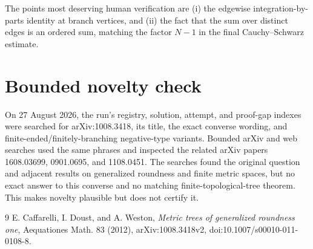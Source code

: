 \documentclass[11pt]{article}
\begin{document}
The points most deserving human verification are (i) the edgewise
integration-by-parts identity at branch vertices, and (ii) the fact that the
sum over distinct edges is an ordered sum, matching the factor
$N-1$ in the final Cauchy--Schwarz estimate.

\section{Bounded novelty check}

On 27 August 2026, the run's registry, solution, attempt, and proof-gap indexes
were searched for arXiv:1008.3418, its title, the exact converse wording, and
finite-ended/finitely-branching negative-type variants.  Bounded arXiv and web
searches used the same phrases and inspected the related arXiv papers
1608.03699, 0901.0695, and 1108.0451.  The searches found the original question
and adjacent results on generalized roundness and finite metric spaces, but no
exact answer to this converse and no matching finite-topological-tree theorem.
This makes novelty plausible but does not certify it.

\begin{thebibliography}{9}
E. Caffarelli, I. Doust, and A. Weston,
\emph{Metric trees of generalized roundness one},
Aequationes Math. 83 (2012), arXiv:1008.3418v2,
doi:10.1007/s00010-011-0108-8.
\end{thebibliography}
\end{document}
